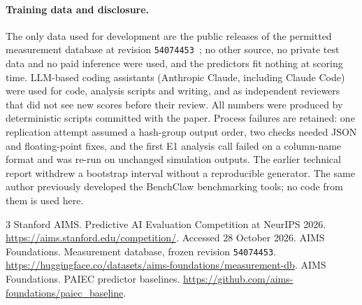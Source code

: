 \documentclass{article}
\begin{document}
\paragraph{Training data and disclosure.} The only data used for development
are the public releases of the permitted measurement database at revision
\texttt{54074453}~\cite{data}; no other source, no private test data and no
paid inference were used, and the predictors fit nothing at scoring time.
LLM-based coding assistants (Anthropic Claude, including Claude Code) were used
for code, analysis scripts and writing, and as independent reviewers that did
not see new scores before their review. All numbers were produced by
deterministic scripts committed with the paper. Process failures are retained:
one replication attempt assumed a hash-group output order, two checks needed
JSON and floating-point fixes, and the first E1 analysis call failed on a
column-name format and was re-run on unchanged simulation outputs. The earlier
technical report withdrew a bootstrap interval without a reproducible generator.
The same author previously developed the BenchClaw benchmarking tools; no code
from them is used here.

\begin{thebibliography}{3}
 Stanford AIMS. Predictive AI Evaluation Competition at NeurIPS 2026.
\url{https://aims.stanford.edu/competition/}. Accessed 28 October 2026.
 AIMS Foundations. Measurement database, frozen revision
\texttt{54074453}. \url{https://huggingface.co/datasets/aims-foundations/measurement-db}.
 AIMS Foundations. PAIEC predictor baselines.
\url{https://github.com/aims-foundations/paiec_baseline}.
\end{thebibliography}
\end{document}
